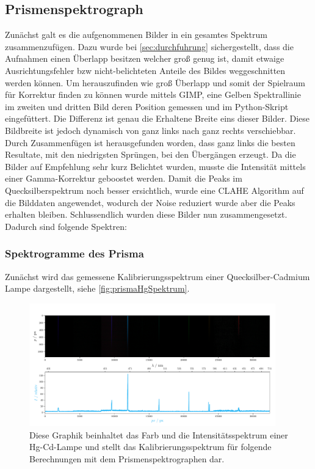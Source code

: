 \documentclass[12pt,english,ngerman]{scrartcl}
\begin{document}
\subsection{Prismenspektrograph}
Zunächst galt es die aufgenommenen Bilder in ein gesamtes Spektrum
zusammenzufügen. Dazu wurde bei \autoref{sec:durchfuhrung} sichergestellt, dass
die Aufnahmen einen Überlapp besitzen welcher groß genug ist, damit etwaige
Ausrichtungsfehler bzw nicht-belichteten Anteile des Bildes weggeschnitten
werden können. Um herauszufinden wie groß Überlapp und somit der Spielraum für
Korrektur finden zu können wurde mittels GIMP, eine Gelben Spektrallinie im
zweiten und dritten Bild deren Position gemessen und im Python-Skript
eingefüttert. Die Differenz ist genau die Erhaltene Breite eins dieser Bilder.
Diese Bildbreite ist jedoch dynamisch von ganz links nach ganz rechts
verschiebbar. Durch Zusammenfügen ist herausgefunden worden, dass ganz links
die besten Resultate, mit den niedrigsten Sprüngen, bei den Übergängen erzeugt.
Da die Bilder auf Empfehlung sehr kurz Belichtet wurden, musste die Intensität
mittels einer Gamma-Korrektur geboostet werden. Damit die Peaks im
Quecksilberspektrum noch besser ersichtlich, wurde eine CLAHE Algorithm auf die
Bilddaten angewendet, wodurch der Noise reduziert wurde aber die Peaks erhalten
bleiben. Schlussendlich wurden diese Bilder nun zusammengesetzt. Dadurch sind
folgende Spektren:

\subsubsection{Spektrogramme des Prisma}
Zunächst wird das gemessene Kalibrierungsspektrum einer Quecksilber-Cadmium
Lampe dargestellt, siehe \autoref{fig:prismaHgSpektrum}.

\begin{figure}[H]
	\begin{center}
		\includegraphics[width=0.95\textwidth]{figures/Hg_plot.pdf}
	\end{center}
	\caption{
		Diese Graphik beinhaltet das Farb und die Intensitätsspektrum einer
		Hg-Cd-Lampe und stellt das Kalibrierungsspektrum für folgende 
		Berechnungen mit dem Prismenspektrographen dar. 
	}\label{fig:prismaHgSpektrum}
\end{figure}
\end{document}
